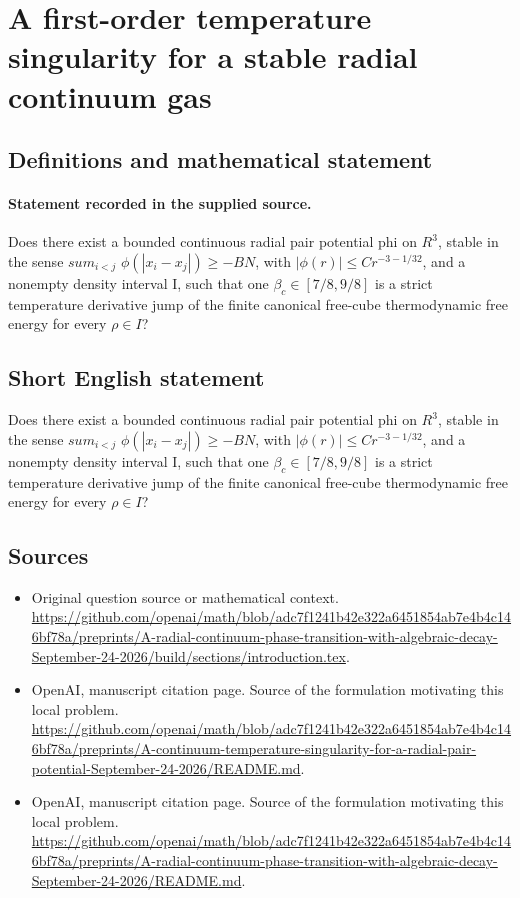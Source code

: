 \documentclass[11pt]{article}
\begin{document}
\section*{A first-order temperature singularity for a stable radial continuum gas}\label{30007382}
\subsection{Definitions and mathematical statement}
\paragraph{Statement recorded in the supplied source.}
Does there exist a bounded continuous radial pair potential phi on $R^3$, stable in the sense $sum_{i<j}$ $\phi (|x_i-x_j|)\geq -BN$, with $|\phi (r)|\leq Cr^{-3-1/32}$, and a nonempty density interval I, such that one $\beta _c\in [7/8,9/8]$ is a strict temperature derivative jump of the finite canonical free-cube thermodynamic free energy for every $\rho \in I$?
\subsection{Short English statement}
Does there exist a bounded continuous radial pair potential phi on $R^3$, stable in the sense $sum_{i<j}$ $\phi (|x_i-x_j|)\geq -BN$, with $|\phi (r)|\leq Cr^{-3-1/32}$, and a nonempty density interval I, such that one $\beta _c\in [7/8,9/8]$ is a strict temperature derivative jump of the finite canonical free-cube thermodynamic free energy for every $\rho \in I$?
\subsection{Sources}
\begin{itemize}
\item[S1] Original question source or mathematical context.
\url{https://github.com/openai/math/blob/adc7f1241b42e322a6451854ab7e4b4c146bf78a/preprints/A-radial-continuum-phase-transition-with-algebraic-decay-September-24-2026/build/sections/introduction.tex}.
\item[S2] OpenAI, manuscript citation page. Source of the formulation motivating this local problem.
\url{https://github.com/openai/math/blob/adc7f1241b42e322a6451854ab7e4b4c146bf78a/preprints/A-continuum-temperature-singularity-for-a-radial-pair-potential-September-24-2026/README.md}.
\item[S3] OpenAI, manuscript citation page. Source of the formulation motivating this local problem.
\url{https://github.com/openai/math/blob/adc7f1241b42e322a6451854ab7e4b4c146bf78a/preprints/A-radial-continuum-phase-transition-with-algebraic-decay-September-24-2026/README.md}.
\end{itemize}
\end{document}
